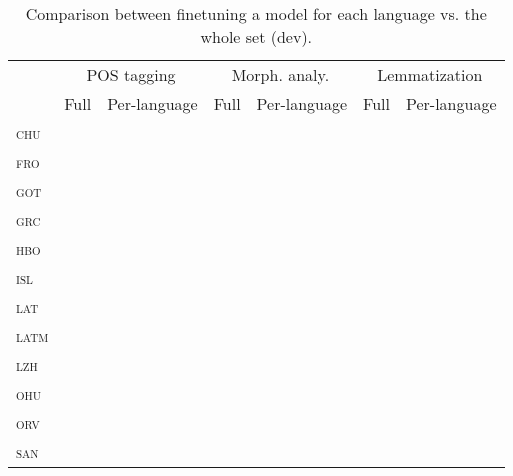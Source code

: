 \documentclass{../acl_latex.tex}
\begin{document}
\begin{table*}[t]
\centering
\begin{tabular}{lrrrrrr}
\toprule
                 & \multicolumn{2}{c}{POS tagging} & \multicolumn{2}{c}{Morph. analy.} & \multicolumn{2}{c}{Lemmatization} \\
                 & Full     & Per-language & Full   & Per-language  & Full        & Per-language     \\ \midrule
\textsc{chu}     &          &              &        &               &             &                  \\ 
\textsc{fro}     &          &              &        &               &             &                  \\
\textsc{got}     &          &              &        &               &             &                  \\
\textsc{grc}     &          &              &        &               &             &                  \\
\textsc{hbo}     &          &              &        &               &             &                  \\
\textsc{isl}     &          &              &        &               &             &                  \\
\textsc{lat}     &          &              &        &               &             &                  \\
\textsc{latm}    &          &              &        &               &             &                  \\
\textsc{lzh}     &          &              &        &               &             &                  \\
\textsc{ohu}     &          &              &        &               &             &                  \\
\textsc{orv}     &          &              &        &               &             &                  \\
\textsc{san}     &          &              &        &               &             &                  \\ \bottomrule 
\end{tabular}
\caption{
    Comparison between finetuning a model for each language vs. the whole set (dev).
}
\end{table*}
\end{document}
